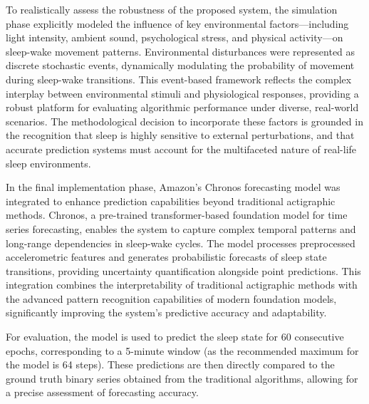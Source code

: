 \documentclass[conference]{IEEEtran}
\begin{document}
To realistically assess the robustness of the proposed system, the simulation phase explicitly modeled the influence of key environmental factors—including light intensity, ambient sound, psychological stress, and physical activity—on sleep-wake movement patterns. Environmental disturbances were represented as discrete stochastic events, dynamically modulating the probability of movement during sleep-wake transitions. This event-based framework reflects the complex interplay between environmental stimuli and physiological responses, providing a robust platform for evaluating algorithmic performance under diverse, real-world scenarios. The methodological decision to incorporate these factors is grounded in the recognition that sleep is highly sensitive to external perturbations, and that accurate prediction systems must account for the multifaceted nature of real-life sleep environments.

In the final implementation phase, Amazon's Chronos forecasting model was integrated to enhance prediction capabilities beyond traditional actigraphic methods. Chronos, a pre-trained transformer-based foundation model for time series forecasting, enables the system to capture complex temporal patterns and long-range dependencies in sleep-wake cycles. The model processes preprocessed accelerometric features and generates probabilistic forecasts of sleep state transitions, providing uncertainty quantification alongside point predictions. This integration combines the interpretability of traditional actigraphic methods with the advanced pattern recognition capabilities of modern foundation models, significantly improving the system's predictive accuracy and adaptability. 

For evaluation, the model is used to predict the sleep state for 60 consecutive epochs, corresponding to a 5-minute window (as the recommended maximum for the model is 64 steps). These predictions are then directly compared to the ground truth binary series obtained from the traditional algorithms, allowing for a precise assessment of forecasting accuracy.



\end{document}
